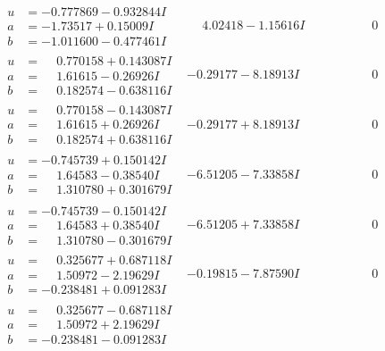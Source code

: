 \documentclass[1p]{elsarticle_modified}
\theoremstyle{definition}
\begin{document}
$$\begin{array}{c|c|c}
\begin{aligned}
u &= -0.777869 - 0.932844 I \\
a &= -1.73517 + 0.15009 I \\
b &= -1.011600 - 0.477461 I\end{aligned}
 & \phantom{-}4.02418 - 1.15616 I & \phantom{-0.000000 } 0 \\ \hline\begin{aligned}
u &= \phantom{-}0.770158 + 0.143087 I \\
a &= \phantom{-}1.61615 - 0.26926 I \\
b &= \phantom{-}0.182574 - 0.638116 I\end{aligned}
 & -0.29177 - 8.18913 I & \phantom{-0.000000 } 0 \\ \hline\begin{aligned}
u &= \phantom{-}0.770158 - 0.143087 I \\
a &= \phantom{-}1.61615 + 0.26926 I \\
b &= \phantom{-}0.182574 + 0.638116 I\end{aligned}
 & -0.29177 + 8.18913 I & \phantom{-0.000000 } 0 \\ \hline\begin{aligned}
u &= -0.745739 + 0.150142 I \\
a &= \phantom{-}1.64583 - 0.38540 I \\
b &= \phantom{-}1.310780 + 0.301679 I\end{aligned}
 & -6.51205 - 7.33858 I & \phantom{-0.000000 } 0 \\ \hline\begin{aligned}
u &= -0.745739 - 0.150142 I \\
a &= \phantom{-}1.64583 + 0.38540 I \\
b &= \phantom{-}1.310780 - 0.301679 I\end{aligned}
 & -6.51205 + 7.33858 I & \phantom{-0.000000 } 0 \\ \hline\begin{aligned}
u &= \phantom{-}0.325677 + 0.687118 I \\
a &= \phantom{-}1.50972 - 2.19629 I \\
b &= -0.238481 + 0.091283 I\end{aligned}
 & -0.19815 - 7.87590 I & \phantom{-0.000000 } 0 \\ \hline\begin{aligned}
u &= \phantom{-}0.325677 - 0.687118 I \\
a &= \phantom{-}1.50972 + 2.19629 I \\
b &= -0.238481 - 0.091283 I\end{aligned}

\end{array}$$
\end{document}
